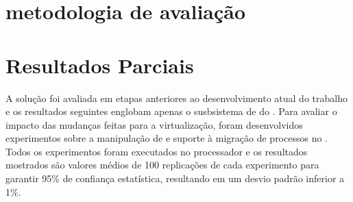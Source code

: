 \glsresetall
\chapter{metodologia de avaliação}

\chapter{Resultados Parciais}
\label{chap.results}

A solução foi avaliada em etapas anteriores ao desenvolvimento atual do trabalho e os resultados seguintes englobam apenas o susbsistema de \threads do \nanvix. 
%
Para avaliar o impacto das mudanças feitas para a virtualização, foram desenvolvidos experimentos sobre a manipulação de \threads e suporte à migração de processos no \nanvix. Todos os experimentos foram executados no processador \mppa e os resultados mostrados são valores médios de 100 replicações de cada experimento para garantir 95\% de confiança estatística, resultando em um desvio padrão inferior a 1\%.

